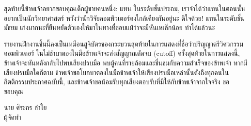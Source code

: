 สุดท้ายนี้ข้าพเจ้าอยากขอบคุณเด็กผู้ชายคนหนึ่ง: แทน ในระดับชั้นประถม, เราจำได้ว่าแทนในตอนนั้นอยากเป็นนักวิทยาศาสตร์ หวังว่านักวิจัยคอมพิวเตอร์คงใกล้เคียงกันอยู่นะ ดีใจด้วย! แทนในระดับชั้นมัธยม เก่งมากนะที่ยืนหยัดตัวเองให้มาในทางที่ชอบแม้ว่าจะมีหันเหเล็กน้อย ทำได้แล้วนะ

รายงานฝึกงานชิ้นนี้คงเป็นเหมือนสูจิบัตรของกระบวนสุดท้ายในการแสดงที่ชื่อว่าปริญญาตรีวิศวกรรมคอมพิวเตอร์ ในไม่ช้าบาตองในมือข้าพเจ้าจะส่งสัญญาณตัดจบ (cutoff) ครั้งสุดท้ายในการแสดงนี้, ข้าพเจ้าจะหันหลังกลับไปพบเสียงปรบมือ พบผู้คนที่รายล้อมและชื่นชมกับความสำเร็จของข้าพเจ้า หากมีเสียงปรบมือใดก็ตาม ข้าพเจ้าขอโบกบาตองในมือข้าพเจ้าให้เสียงปรบมือเหล่านั้นดังถึงทุกคนในกิตติกรรมประกาศฉบับนี้, และข้าพเจ้าขอน้อมรับทุกเสียงตอบรับที่มีให้กับข้าพเจ้าจากใจจริง ขอขอบคุณ

\vskip 20pt

\hfill\begin{minipage}
    {\dimexpr 5cm}
    \begin{center}
        นาย ศิระกร ลำใย\\
        ผู้จัดทำ
    \end{center}
    \xdef\tpd{\the\prevdepth}
\end{minipage}